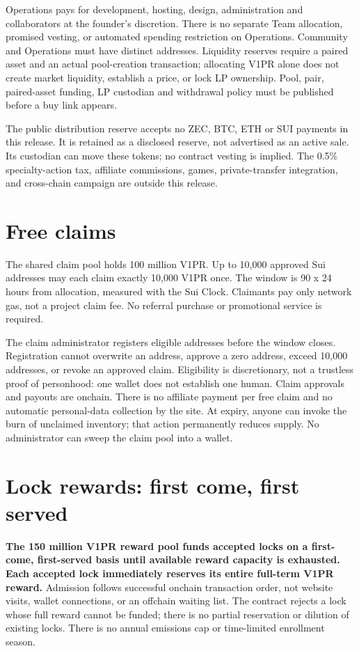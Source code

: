 \documentclass[11pt]{article}
\begin{document}
Operations pays for development, hosting, design, administration and collaborators at the founder's discretion. There is no separate Team allocation, promised vesting, or automated spending restriction on Operations. Community and Operations must have distinct addresses. Liquidity reserves require a paired asset and an actual pool-creation transaction; allocating V1PR alone does not create market liquidity, establish a price, or lock LP ownership. Pool, pair, paired-asset funding, LP custodian and withdrawal policy must be published before a buy link appears.

The public distribution reserve accepts no ZEC, BTC, ETH or SUI payments in this release. It is retained as a disclosed reserve, not advertised as an active sale. Its custodian can move these tokens; no contract vesting is implied. The 0.5\% specialty-action tax, affiliate commissions, games, private-transfer integration, and cross-chain campaign are outside this release.

\section{Free claims}

The shared claim pool holds 100 million V1PR. Up to 10,000 approved Sui addresses may each claim exactly 10,000 V1PR once. The window is 90  x  24 hours from allocation, measured with the Sui Clock. Claimants pay only network gas, not a project claim fee. No referral purchase or promotional service is required.

The claim administrator registers eligible addresses before the window closes. Registration cannot overwrite an address, approve a zero address, exceed 10,000 addresses, or revoke an approved claim. Eligibility is discretionary, not a trustless proof of personhood: one wallet does not establish one human. Claim approvals and payouts are onchain. There is no affiliate payment per free claim and no automatic personal-data collection by the site. At expiry, anyone can invoke the burn of unclaimed inventory; that action permanently reduces supply. No administrator can sweep the claim pool into a wallet.

\section{Lock rewards: first come, first served}

\textbf{The 150 million V1PR reward pool funds accepted locks on a first-come, first-served basis until available reward capacity is exhausted. Each accepted lock immediately reserves its entire full-term V1PR reward.} Admission follows successful onchain transaction order, not website visits, wallet connections, or an offchain waiting list. The contract rejects a lock whose full reward cannot be funded; there is no partial reservation or dilution of existing locks. There is no annual emissions cap or time-limited enrollment season.
\end{document}
